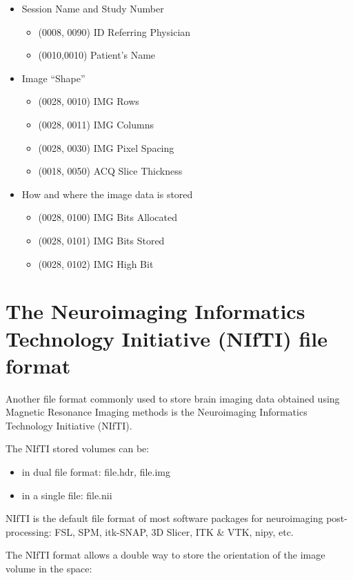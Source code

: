 \begin{itemize}
	\item Session Name and Study Number
	\begin{itemize}
		\item (0008, 0090) ID Referring Physician
		\item (0010,0010) Patient's Name
	\end{itemize}
	\item Image “Shape”
	\begin{itemize}
		\item (0028, 0010) IMG Rows
		\item (0028, 0011) IMG Columns
		\item (0028, 0030) IMG Pixel Spacing
		\item (0018, 0050) ACQ Slice Thickness
	\end{itemize}
	\item How and where the image data is stored
	\begin{itemize}
		\item (0028, 0100) IMG Bits Allocated
		\item (0028, 0101) IMG Bits Stored
		\item (0028, 0102) IMG High Bit
	\end{itemize}
\end{itemize}



\section{The Neuroimaging Informatics Technology Initiative (NIfTI) file format}

Another file format commonly used to store brain imaging data obtained using Magnetic Resonance Imaging methods is the Neuroimaging Informatics Technology Initiative (NIfTI).

The NIfTI stored volumes can be:
\begin{itemize}
	\item in dual file format: file.hdr, file.img
	\item in a single file: file.nii
\end{itemize}

NIfTI is the default file format of most software packages for neuroimaging post-processing: FSL, SPM, itk-SNAP, 3D Slicer, ITK \& VTK, nipy, etc.

The NIfTI format allows a double way to store the orientation of the image volume in the
space:

